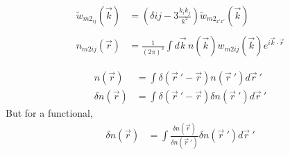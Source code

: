 \documentclass[double,12pt]{beavtex}
\begin{document}
\begin{align}
    \widetilde{w}_{m2_{ij}}(\vec{k}) &= (\delta{ij}-3\frac{k_ik_j}{k^2})
                                    \widetilde{w}_{{m2}_{x'x'}}(\vec{k}) \\ \nonumber \\
    n_{m2ij}(\vec r) &=  \frac{1}{\left(2\pi\right)^3}\int d\vec k\, 
                       n(\vec k) w_{m2ij}(\vec k)e^{i\vec k\cdot \vec r}
\end{align} 

\begin{align} 
  n(\vec r) &= \int \delta (\vec r~'-\vec r)n(\vec r~') d\vec r~'\\
  \delta n(\vec r) &= \int \delta (\vec r~'-\vec r)\delta n(\vec r~')
  d\vec r~'
\end{align} 
But for a functional,
\begin{align} 
\delta n(\vec r) &= \int \frac{\delta n(\vec r)}{\delta n(\vec r~')}
\delta n(\vec r~')d\vec r~'
\end{align} 
\end{document}
